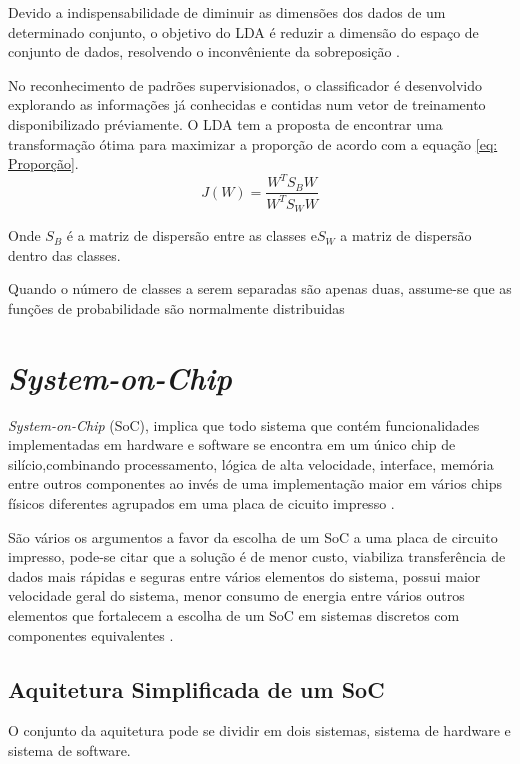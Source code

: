 Devido a indispensabilidade de diminuir as dimensões dos dados de um determinado conjunto, o objetivo do LDA
é reduzir a dimensão do espaço de conjunto de dados, resolvendo o inconvêniente da sobreposição \cite{SinghLDA}.

No reconhecimento de padrões supervisionados, o classificador é desenvolvido explorando as informações 
já conhecidas e contidas num vetor de treinamento disponibilizado préviamente\cite{izenmanLDA}. O LDA tem a 
proposta de encontrar uma transformação ótima para maximizar a proporção de acordo com a equação \ref{eq: Proporção}.
\begin{equation}
	\label{eq: Proporção}
	J(W) = \frac { W^T S_B W}{W^T S_W W}
\end{equation}

Onde $S_B$ é a matriz de dispersão entre as classes e$ S_W$ a matriz de dispersão dentro das classes. 

Quando o número de classes a serem separadas são apenas duas, assume-se que as funções de probabilidade
são normalmente distribuidas

\section{\textit{System-on-Chip}}

\textit{System-on-Chip} (SoC), implica que todo sistema que contém funcionalidades implementadas em hardware e software se encontra em um único chip de silício,combinando processamento, lógica de alta velocidade, interface, memória entre outros componentes ao invés de uma implementação maior em vários chips físicos diferentes agrupados em uma placa 
de cicuito impresso \cite{zynqBook}.

São vários os argumentos a favor da escolha de um SoC a uma placa de circuito impresso, pode-se citar que a solução é de menor custo, viabiliza transferência de dados mais rápidas e seguras entre vários elementos do sistema, possui maior velocidade geral do sistema, menor consumo de energia entre vários outros elementos que fortalecem a escolha de um SoC em sistemas discretos com componentes equivalentes \cite{zynqBook}.

\subsection{Aquitetura Simplificada de um SoC}

O conjunto da aquitetura pode se dividir em dois sistemas, sistema de
hardware  e sistema de software. 


